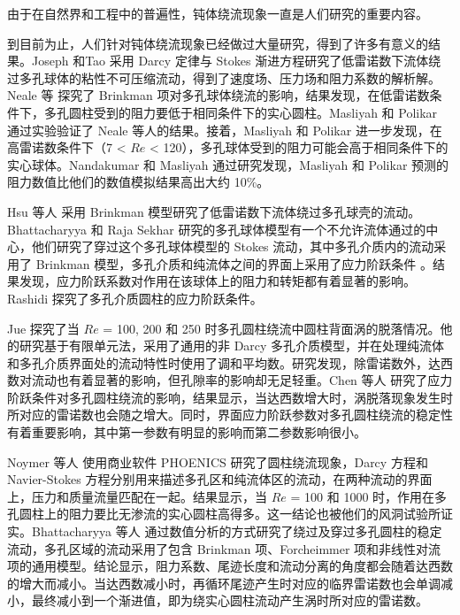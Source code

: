 由于在自然界和工程中的普遍性，钝体绕流现象一直是人们研究的重要内容。

到目前为止，人们针对钝体绕流现象已经做过大量研究，得到了许多有意义的结果。Joseph 和Tao \cite{joseph1964effect} 采用 Darcy 定律与 Stokes 渐进方程研究了低雷诺数下流体绕过多孔球体的粘性不可压缩流动，得到了速度场、压力场和阻力系数的解析解。Neale 等 \cite{neale1973creeping} 探究了 Brinkman 项对多孔球体绕流的影响，结果发现，在低雷诺数条件下，多孔圆柱受到的阻力要低于相同条件下的实心圆柱。Masliyah 和 Polikar \cite{masliyah1980terminal} 通过实验验证了 Neale 等人的结果。接着，Masliyah 和 Polikar \cite{masliyah1980terminal} 进一步发现，在高雷诺数条件下（7 < $Re$ < 120），多孔球体受到的阻力可能会高于相同条件下的实心球体。Nandakumar 和 Masliyah \cite{nandakumar1982laminar} 通过研究发现，Masliyah 和 Polikar 预测的阻力数值比他们的数值模拟结果高出大约 10\%。

Hsu 等人 \cite{hsu2004re} 采用 Brinkman 模型研究了低雷诺数下流体绕过多孔球壳的流动。Bhattacharyya 和 Raja Sekhar \cite{bhattacharyya2004viscous} 研究的多孔球体模型有一个不允许流体通过的中心，他们研究了穿过这个多孔球体模型的 Stokes 流动，其中多孔介质内的流动采用了 Brinkman 模型，多孔介质和纯流体之间的界面上采用了应力阶跃条件 \cite{ochoa1995momentum1,ochoa1995momentum2}。结果发现，应力阶跃系数对作用在该球体上的阻力和转矩都有着显著的影响。Rashidi\cite{Rashidi2015} 探究了多孔介质圆柱的应力阶跃条件。%

Jue \cite{jue2004numerical} 探究了当 $Re$ = 100, 200 和 250 时多孔圆柱绕流中圆柱背面涡的脱落情况。他的研究基于有限单元法，采用了通用的非 Darcy 多孔介质模型，并在处理纯流体和多孔介质界面处的流动特性时使用了调和平均数。研究发现，除雷诺数外，达西数对流动也有着显著的影响，但孔隙率的影响却无足轻重。Chen 等人 \cite{chen2008numerical} 研究了应力阶跃条件对多孔圆柱绕流的影响，结果显示，当达西数增大时，涡脱落现象发生时所对应的雷诺数也会随之增大。同时，界面应力阶跃参数对多孔圆柱绕流的稳定性有着重要影响，其中第一参数有明显的影响而第二参数影响很小。

Noymer 等人 \cite{noymer1998drag} 使用商业软件 PHOENICS 研究了圆柱绕流现象，Darcy 方程和 Navier-Stokes 方程分别用来描述多孔区和纯流体区的流动，在两种流动的界面上，压力和质量流量匹配在一起。结果显示，当 $Re$ = 100 和 1000 时，作用在多孔圆柱上的阻力要比无渗流的实心圆柱高得多。这一结论也被他们的风洞试验所证实。Bhattacharyya 等人 \cite{bhattacharyya2006fluid} 通过数值分析的方式研究了绕过及穿过多孔圆柱的稳定流动，多孔区域的流动采用了包含 Brinkman 项、Forcheimmer 项和非线性对流项的通用模型。结论显示，阻力系数、尾迹长度和流动分离的角度都会随着达西数的增大而减小。当达西数减小时，再循环尾迹产生时对应的临界雷诺数也会单调减小，最终减小到一个渐进值，即为绕实心圆柱流动产生涡时所对应的雷诺数。

